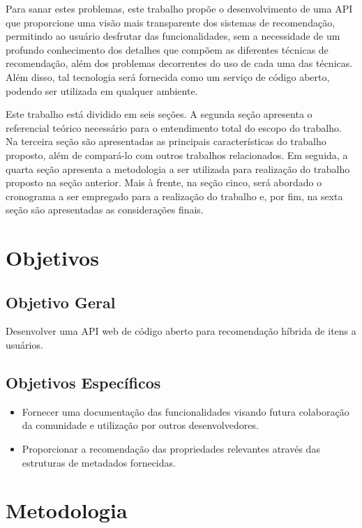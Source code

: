 \documentclass[12pt, openright, oneside, a4paper, brazil]{abntex2}
\begin{document}
Para sanar estes problemas, este trabalho propõe o desenvolvimento de uma API que proporcione uma visão mais transparente dos sistemas de recomendação, permitindo ao usuário desfrutar das funcionalidades, sem a necessidade de um profundo conhecimento dos detalhes que compõem as diferentes técnicas de recomendação, além dos problemas decorrentes do uso de cada uma das técnicas. Além disso, tal tecnologia será fornecida como um serviço de código aberto, podendo ser utilizada em qualquer ambiente.

Este trabalho está dividido em seis seções. A segunda seção apresenta o referencial teórico necessário para o entendimento total do escopo do trabalho. Na terceira seção são apresentadas as principais características do trabalho proposto, além de compará-lo com outros trabalhos relacionados. Em seguida, a quarta seção apresenta a metodologia a ser utilizada para realização do trabalho proposto na seção anterior. Mais à frente, na seção cinco, será abordado o cronograma a ser empregado para a realização do trabalho e, por fim, na sexta seção são apresentadas as considerações finais.

\section{Objetivos} \label{objectives}

\subsection{Objetivo Geral}

Desenvolver uma API web de código aberto para recomendação híbrida de itens a usuários.

\subsection{Objetivos Específicos}

\begin{itemize}
	\item Fornecer uma documentação das funcionalidades visando futura colaboração da comunidade e utilização por outros desenvolvedores.

	\item Proporcionar a recomendação das propriedades relevantes através das estruturas de metadados fornecidas.
\end{itemize}

\section{Metodologia}
\end{document}
